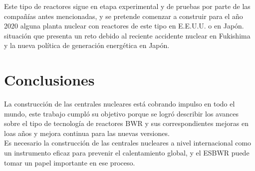 \documentclass[]{article}
\begin{document}
Este tipo de reactores sigue en etapa experimental y de pruebas por parte de las compañías antes mencionadas, y se pretende comenzar a construir para el año 2020 alguna planta nuclear con reactores de este tipo en E.E.U.U. o en Japón. situación que presenta un reto debido al reciente accidente nuclear en Fukishima y la nueva política de generación energética en Japón.\\






\section{Conclusiones}

La construcción de las centrales nucleares está cobrando impulso en todo el mundo, este trabajo cumpló su objetivo porque se logró describir los avances sobre el tipo de tecnología de reactores BWR y sus correspondientes mejoras en loas años y mejora continua para las nuevas versiones.\\

 Es necesario la construcción de las centrales nucleares a nivel internacional como un instrumento eficaz para prevenir el calentamiento global, y el ESBWR puede tomar un papel importante en ese proceso.\\




\end{document}
